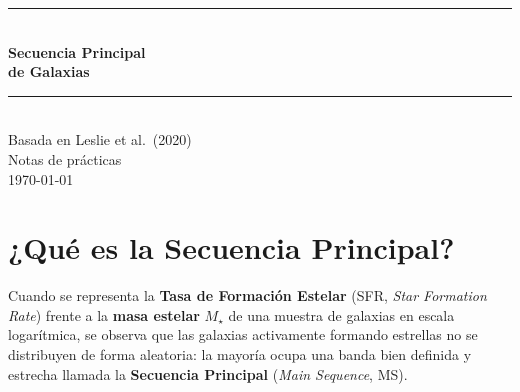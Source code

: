 \documentclass[12pt, a4paper]{article}
\begin{document}
\begin{titlepage}
    \centering
    \vspace*{2cm}
    {\color{azulms}\rule{\linewidth}{1.5pt}}\\[0.4cm]
    {\LARGE\bfseries\color{azulms}
        Secuencia Principal\\[0.3cm]
        de Galaxias}\\[0.4cm]
    {\color{azulms}\rule{\linewidth}{1.5pt}}\\[1.5cm]
    {\normalsize
        Basada en Leslie et al.\ (2020)}\\[2cm]
    {\normalsize Notas de prácticas}\\[0.5cm]
    {\normalsize \today}
    \vfill
\end{titlepage}

\tableofcontents
\newpage

\section{¿Qué es la Secuencia Principal?}

Cuando se representa la \textbf{Tasa de Formación Estelar} (SFR,
\textit{Star Formation Rate}) frente a la \textbf{masa estelar} $M_\star$
de una muestra de galaxias en escala logarítmica, se observa que las galaxias
activamente formando estrellas no se distribuyen de forma aleatoria:
la mayoría ocupa una banda bien definida y estrecha llamada la
\textbf{Secuencia Principal} (\textit{Main Sequence}, MS).
\end{document}
